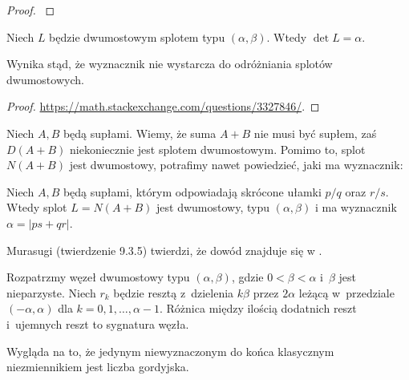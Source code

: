 \begin{proof}
    \cite[fakt 9.3.4]{murasugi96}
\end{proof}

\begin{proposition}
    Niech $L$ będzie dwumostowym splotem typu $(\alpha, \beta)$.
    Wtedy $\det L = \alpha$.
\end{proposition}

Wynika stąd, że wyznacznik nie wystarcza do odróżniania splotów dwumostowych.

\begin{proof}
    \url{https://math.stackexchange.com/questions/3327846/}.
\end{proof}

Niech $A, B$ będą supłami.
Wiemy, że suma $A+B$ nie musi być supłem, zaś $D(A+B)$ niekoniecznie jest splotem dwumostowym.
Pomimo to, splot $N(A+B)$ jest dwumostowy, potrafimy nawet powiedzieć, jaki ma wyznacznik:

\begin{proposition}

    Niech $A, B$ będą supłami, którym odpowiadają skrócone ułamki $p/q$ oraz $r/s$.
    Wtedy splot $L = N(A+B)$ jest dwumostowy, typu $(\alpha, \beta)$ i ma wyznacznik $\alpha = |ps + qr|$.
\end{proposition}

Murasugi (twierdzenie 9.3.5) twierdzi, że dowód znajduje się w \cite{ernst90}.

\begin{proposition}
    Rozpatrzmy węzeł dwumostowy typu $(\alpha, \beta)$, gdzie $0 < \beta < \alpha$ i~$\beta$ jest nieparzyste.
    Niech $r_k$ będzie resztą z~dzielenia $k\beta$ przez $2\alpha$ leżącą w~przedziale $(-\alpha, \alpha)$ dla $k = 0, 1, \ldots, \alpha - 1$.
    Różnica między ilością dodatnich reszt i~ujemnych reszt to sygnatura węzła.
\end{proposition}

Wygląda na to, że jedynym niewyznaczonym do końca klasycznym niezmiennikiem jest liczba gordyjska.


